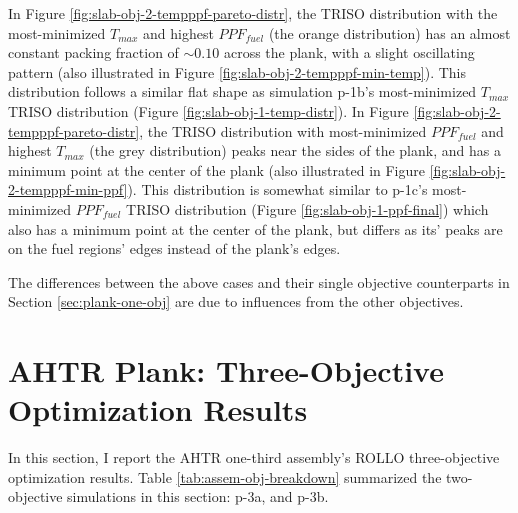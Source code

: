In Figure \ref{fig:slab-obj-2-tempppf-pareto-distr}, the TRISO distribution with 
the most-minimized $T_{max}$ and highest $PPF_{fuel}$ (the orange distribution) 
has an almost constant packing fraction of $\sim0.10$ across the plank, with a 
slight oscillating pattern (also illustrated in Figure 
\ref{fig:slab-obj-2-tempppf-min-temp}).
This distribution follows a similar flat shape as simulation p-1b's most-minimized 
$T_{max}$ TRISO distribution (Figure \ref{fig:slab-obj-1-temp-distr}).
In Figure \ref{fig:slab-obj-2-tempppf-pareto-distr}, the TRISO distribution with 
most-minimized $PPF_{fuel}$ and highest $T_{max}$
(the grey distribution) peaks near the sides of the plank, and has a minimum point at 
the center of the plank (also illustrated in Figure \ref{fig:slab-obj-2-tempppf-min-ppf}). 
This distribution is somewhat similar to p-1c's most-minimized $PPF_{fuel}$ TRISO distribution 
(Figure \ref{fig:slab-obj-1-ppf-final}) which also has a minimum point at the center 
of the plank, but differs as its' peaks are on the fuel regions' edges instead of the 
plank's edges. 

The differences between the above cases and their single objective counterparts in 
Section \ref{sec:plank-one-obj} are due to influences from the other objectives. 

\pagebreak
\section{AHTR Plank: Three-Objective Optimization Results}
\label{sec:plank-three-obj}
In this section, I report the \gls{AHTR} one-third assembly's \gls{ROLLO} three-objective 
optimization results. 
Table \ref{tab:assem-obj-breakdown} summarized the two-objective simulations in this 
section: p-3a, and p-3b. 

